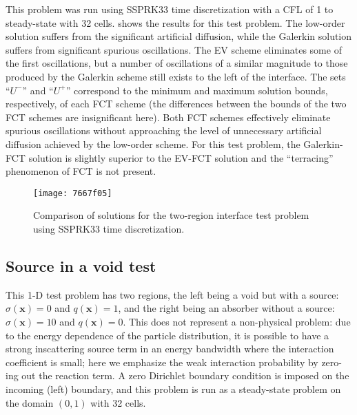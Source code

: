 \documentclass[xchauthor,chkrefs,fixeqskip,GCNS,amsmath,amsthm]{yjcphg}
\theoremstyle{remark}
\begin{document}
This problem was run using SSPRK33 time discretization with a CFL of 1
to steady-state with 32 cells.  shows the
results for this test problem. The low-order solution suffers from the
significant artificial diffusion, while the Galerkin solution suffers
from significant spurious oscillations. The EV scheme eliminates some
of the first oscillations, but a number of oscillations of a similar
magnitude to those produced by the Galerkin scheme still exists to the
left of the interface. The sets ``$U^{-}$'' and ``$U^{+}$'' correspond
to the minimum and maximum solution bounds, respectively, of each FCT
scheme (the differences between the bounds of the two FCT schemes are
insignificant here). Both FCT schemes effectively eliminate spurious
oscillations without approaching the level of unnecessary artificial
diffusion achieved by the low-order scheme. For this test problem, the
Galerkin-FCT solution is slightly superior to the EV-FCT solution and
the ``terracing'' phenomenon of FCT is not present.

\begin{figure}
\texttt{[image: 7667f05]}
\caption{Comparison of solutions for the two-region interface test problem using
SSPRK33 time discretization.}
\label{fig:interface}
\end{figure}

\subsection{Source in a void test}

This 1-D test problem has two regions, the left being a void but with
a source: $\sigma(\mathbf{x})=0$ and $q(\mathbf{x})=1$, and the right
being an absorber without a source: $\sigma(\mathbf{x})=10$ and
$q(\mathbf{x})=0$. This does not represent  a non-physical
problem: due to the energy dependence of the particle distribution, it
is possible to have a strong inscattering source term in an energy
bandwidth where the interaction coefficient is small; here we emphasize
the weak interaction probability by zero-ing out the reaction term. A
zero Dirichlet boundary condition is imposed on the incoming (left)
boundary, and this problem is run as a steady-state problem on the
domain $(0,1)$ with 32 cells.
\end{document}
